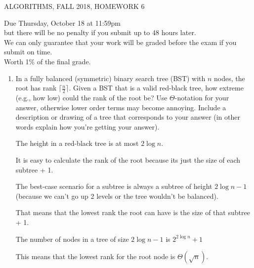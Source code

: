 \documentclass[12pt]{article}
\begin{document}
  
\pagestyle{empty}
 

\begin{center} ALGORITHMS,   FALL 2018, HOMEWORK 6
\end{center}
\noindent Due Thursday, October 18 at 11:59pm\\ but there will be no penalty if you submit up to 48 hours later.  \\

\noindent We can only guarantee that your work will be graded before the exam if you submit on time.\\
Worth 1\% of the final grade.\\


\begin{enumerate}

\item  In a fully balanced (symmetric) binary search tree (BST) with $n$ nodes, the root has rank $\lceil\frac{n}{2}\rceil$. Given a BST that is a valid red-black tree, how extreme (e.g., how low) could the rank of the root be?  Use $\Theta$-notation for your answer, otherwise lower order terms may become annoying. Include a description or drawing of a tree that corresponds to your answer (in other words explain how you're getting your answer).

The height in a red-black tree is at most $2\log n$.  

It is easy to calculate the rank of the root because its just the size of each subtree + 1.

The best-case scenario for a subtree is always a subtree of height $2 \log n -1$ (because we can't go up 2 levels or the tree wouldn't be balanced).

That means that the lowest rank the root can have is the size of that subtree + 1.

The number of nodes in a tree of size $2 \log n - 1$ is $2^{2\log n} + 1$

This means that the lowest rank for the root node is $\Theta(\sqrt n)$.



\end{enumerate}
\end{document}
